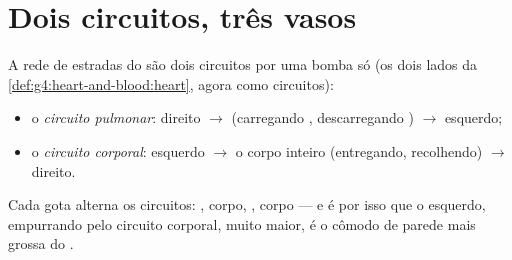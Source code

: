 \section{Dois circuitos, três vasos}

\begin{definition}\label{def:g7:heart-and-circulation:double}
A rede de estradas do  são dois circuitos por uma bomba só (os
dois lados da \cref{def:g4:heart-and-blood:heart}, agora como
circuitos):
\begin{itemize}
  \item o \emph{circuito pulmonar}:  direito $\rightarrow$
         (carregando , descarregando )
        $\rightarrow$  esquerdo;
  \item o \emph{circuito corporal}:  esquerdo $\rightarrow$
        o corpo inteiro (entregando, recolhendo) $\rightarrow$ 
        direito.
\end{itemize}
Cada gota alterna os circuitos: , corpo, , corpo --- e é
por isso que o  esquerdo, empurrando pelo circuito corporal,
muito maior, é o cômodo de parede mais grossa do .
\end{definition}


